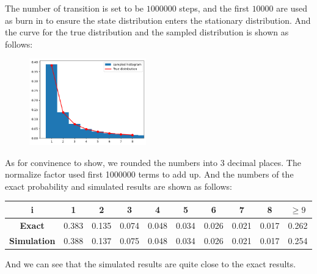 \begin{homeworkProblem}
The number of transition is set to be $1000000$ steps, and the first $10000$ are used as burn in to ensure the state distribution enters the stationary distribution. And the curve for the true distribution and the sampled distribution is shown as follows: \\
\begin{figure}[htbp]
    \centering
    \includegraphics[width=0.45\textwidth]{./figure/p2/distribution.png}
\end{figure}

As for convinence to show, we rounded the numbers into 3 decimal places. The normalize factor used first 1000000 terms to add up. And the numbers of the exact probability and simulated results are shown as follows:
\begin{table}[h]
    \centering
    \begin{tabular}{c ccccccccc}
    \toprule
    i & 1 & 2 & 3 & 4 & 5 & 6 & 7 & 8 & $\geq 9$ \\
    \midrule
    \textbf{Exact}      & 0.383 & 0.135 & 0.074 & 0.048 & 0.034 & 0.026 & 0.021 & 0.017 & 0.262 \\
    \textbf{Simulation} & 0.388 & 0.137 & 0.075 & 0.048 & 0.034 & 0.026 & 0.021 & 0.017 & 0.254 \\
    \bottomrule
    \end{tabular}
\end{table}

And we can see that the simulated results are quite close to the exact results.

\end{homeworkProblem}

\newpage